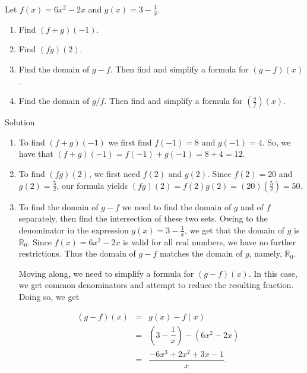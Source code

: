 \begin{example}  
 Let $f(x) = 6x^2 - 2x$ and $g(x) = 3-\frac{1}{x}$.  


\begin{enumerate}
\ifvc
\item Find  $(f+g)(-1)$.

\item Find $(fg)(2)$.
\fi


\item  Find the domain of $g-f$. Then find and simplify a formula for  $(g-f)(x)$.

\item  \label{quotdomainex} Find the domain of $g/f$. Then find and simplify a formula for  $\left(\frac{g}{f}\right)(x)$.

\end{enumerate}

\ifanalysis\pagebreak\fi
\ifcalculus\pagebreak\fi
{}Solution 

\begin{enumerate}
\ifvc
\item  To find $(f+g)(-1)$ we first find $f(-1) = 8$ and $g(-1) = 4$. So, we have that $(f+g)(-1) = f(-1) + g(-1) = 8+4 = 12$.

\item To find $(fg)(2)$, we first need $f(2)$ and $g(2)$. Since $f(2) = 20$ and $g(2) = \frac{5}{2}$, our formula yields $(fg)(2) = f(2) g(2) = (20)\left(\frac{5}{2}\right) = 50$.
\fi

\item To find the domain of $g-f$ we need to find the domain of $g$ and of $f$ separately, then find the intersection of these two sets.  Owing to the denominator in the expression $g(x) = 3 - \frac{1}{x}$, we get that the domain of $g$ is $\mathbb{R}_0$.  Since $f(x) = 6x^2-2x$ is valid for all real numbers, we have no further restrictions.  Thus the domain of $g-f$ matches the domain of $g$, namely, $\mathbb{R}_0$.

Moving along, we need to simplify a formula for $(g-f)(x)$.  In this case, we get common denominators and attempt to reduce the resulting fraction.  Doing so, we get

\[ \begin{array}{rclr}
(g-f)(x) & = & g(x) - f(x) & \\ [5pt]
         & = & \left(3-\dfrac{1}{x}\right) - \left(6x^2 - 2x\right) &\\  [10pt]
         & = & \dfrac{-6x^3+2x^2+3x-1}{x}. & \\   
\end{array}\] 


\end{enumerate}
\end{example}

